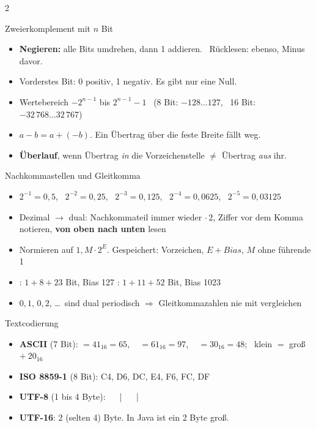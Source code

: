 \documentclass[fontsize=10pt,a4paper,DIV=20,headsepline]{scrartcl}
\newenvironment{kl}{\begin{itemize}[leftmargin=3mm, itemsep=0.1mm, topsep=0.3mm, parsep=0pt, label=\textcolor{diagramm}{\textbullet}]}{\end{itemize}}
\begin{document}
\begin{multicols}{2}
\begin{fs}{Zweierkomplement mit $n$ Bit}
\begin{kl}
\item \textbf{Negieren:} alle Bits umdrehen, dann 1 addieren. \ Rücklesen: ebenso, Minus davor.
\item Vorderstes Bit: 0 positiv, 1 negativ. Es gibt nur eine Null.
\item Wertebereich $-2^{n-1}$ bis $2^{n-1} - 1$ \ (8 Bit: $-128 \ldots 127$, \ 16 Bit: $-32\,768 \ldots 32\,767$)
\item $a - b = a + (-b)$. Ein Übertrag über die feste Breite fällt weg.
\item \textbf{Überlauf}, wenn Übertrag \emph{in} die Vorzeichenstelle $\neq$ Übertrag \emph{aus} ihr.
\end{kl}
\end{fs}

\begin{fs}{Nachkommastellen und Gleitkomma}
\begin{kl}
\item $2^{-1} = 0{,}5$, \ $2^{-2} = 0{,}25$, \ $2^{-3} = 0{,}125$, \ $2^{-4} = 0{,}0625$, \ $2^{-5} = 0{,}03125$
\item Dezimal $\to$ dual: Nachkommateil immer wieder $\cdot\,2$, Ziffer vor dem Komma notieren, \textbf{von oben nach unten} lesen
\item Normieren auf $1{,}M \cdot 2^E$. Gespeichert: Vorzeichen, $E + \mathit{Bias}$, $M$ ohne führende 1
\item {}: $1 + 8 + 23$ Bit, Bias 127 \quad {}: $1 + 11 + 52$ Bit, Bias 1023
\item $0{,}1$, $0{,}2$, \ldots\ sind dual periodisch $\Rightarrow$ Gleitkommazahlen nie mit \code{==} vergleichen
\end{kl}
\end{fs}

\begin{fs}{Textcodierung}
\begin{kl}
\item \textbf{ASCII} (7 Bit):  $= 41_{16} = 65$, \  $= 61_{16} = 97$, \  $= 30_{16} = 48$; \ klein $=$ groß $+\ 20_{16}$
\item \textbf{ISO 8859-1} (8 Bit):  C4,  D6,  DC,  E4,  F6,  FC,  DF
\item \textbf{UTF-8} (1 bis 4 Byte): \  \ | \  \ | \ 
\item \textbf{UTF-16}: 2 (selten 4) Byte. In Java ist ein  2 Byte groß.
\end{kl}
\end{fs}


\end{multicols}
\end{document}
